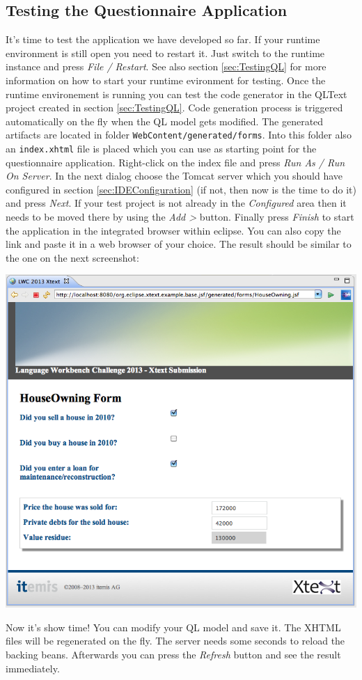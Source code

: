 \subsection{Testing the Questionnaire Application}
\label{sec:TestingQLApplication}

It's time to test the application we have developed so far. If your runtime
environment is still open you need to restart it. Just switch to the runtime
instance and press \emph{File / Restart}. See also section \ref{sec:TestingQL}
for more information on how to start your runtime evironment for testing. Once
the runtime environement is running you can test the code generator in the
QLText project created in section \ref{sec:TestingQL}. Code generation process
is triggered automatically on the fly when the QL model gets modified. The
generated artifacts are located in folder \texttt{WebContent/generated/forms}.
Into this folder also an \texttt{index.xhtml} file is placed which you can use
as starting point for the questionnaire application. Right-click on the index
file and press \emph{Run As / Run On Server}. In the next dialog choose the
Tomcat server which you should have configured in section
\ref{sec:IDEConfiguration} (if not, then now is the time to do it) and press
\emph{Next}. If your test project is not already in the \emph{Configured} area
then it needs to be moved there by using the \emph{Add >} button. Finally press
\emph{Finish} to start the application in the integrated browser within eclipse.
You can also copy the link and paste it in a web browser of your choice. The
result should be similar to the one on the next screenshot:

\begin{center}
\includegraphics[width=15cm]{./images/chapter02/questionnaireApplication.png}
\end{center}
 
Now it's show time! You can modify your QL model and save it. The XHTML files
will be regenerated on the fly. The server needs some seconds to reload the
backing beans. Afterwards you can press the \emph{Refresh} button and see the
result immediately.
